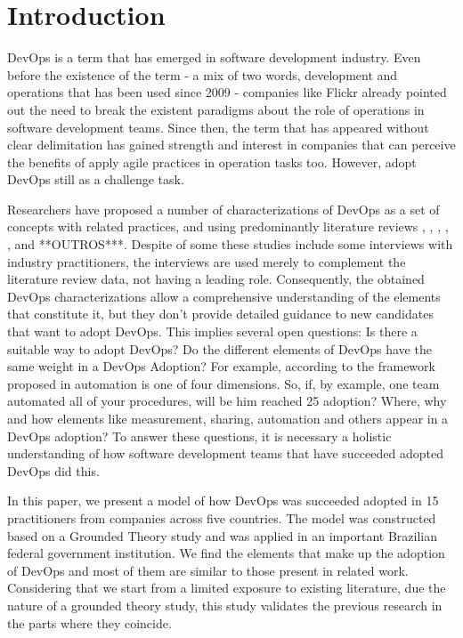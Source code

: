 \section{Introduction}

DevOps is a term that has emerged in software development industry. Even before
the existence of the term - a mix of two words, development and operations that
has been used since 2009 - companies like Flickr \cite{flickr} already
pointed out the need to break the existent paradigms about the role of
operations in software development teams. Since then, the term that has appeared
without clear delimitation has gained strength and interest in companies that
can perceive the benefits of apply agile practices in operation tasks too.
However, adopt DevOps still as a challenge task.

Researchers have proposed a number of characterizations of DevOps as a set of
concepts with related practices, and using predominantly literature reviews
\cite{cooperation_between_esem_14}, \cite{dimensions_of_devops_xp_15},
\cite{extending_dimensions_icsea_16}, \cite{devops_a_definition_xp_15},
\cite{characterizing_devops_sbes_2016}, \cite{a_qualitative_study_journal_sw_17}
and **OUTROS***. Despite of some these studies include some interviews with industry
practitioners, the interviews are used merely to complement the literature
review data, not having a leading role. Consequently, the obtained DevOps
characterizations allow a comprehensive understanding of the elements that
constitute it, but they don't provide detailed guidance to new candidates that
want to adopt DevOps. This implies several open questions: Is there a suitable
way to adopt DevOps? Do the different elements of DevOps have the same weight
in a DevOps Adoption? For example, according to the framework proposed in
\cite{dimensions_xp_2015} automation is one of four dimensions. So, if, by example,
one team automated all of your procedures, will be him reached 25%
adoption? Where, why and how elements like measurement, sharing, automation and
others appear in a DevOps adoption? To answer these questions, it is necessary a
holistic understanding of how software development teams that have succeeded
adopted DevOps did this.

In this paper, we present a model of how DevOps was succeeded adopted in 15
practitioners from companies across five countries. The model was constructed
based on a Grounded Theory study and was applied in an important Brazilian
federal government institution. We find the elements that make up the adoption
of DevOps and most of them are similar to those present in related work.
Considering that we start from a limited exposure to existing literature,
due the nature of a grounded theory study, this study validates the previous
research in the parts where they coincide.


